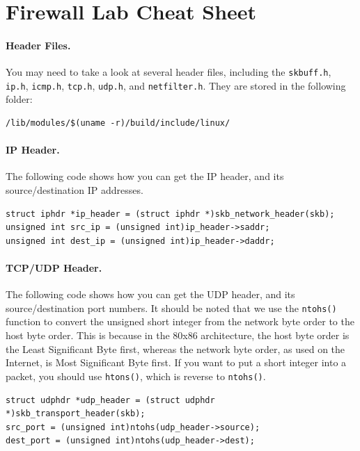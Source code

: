 \newpage
\appendix

\section{Firewall Lab Cheat Sheet} 
\label{sec:cheatsheet}

\paragraph{Header Files.} You may need to take a look at several header
files, including the {\tt skbuff.h}, {\tt ip.h}, {\tt icmp.h}, 
{\tt tcp.h}, {\tt udp.h}, and {\tt netfilter.h}. They are stored in
the following folder: 
\begin{Verbatim}[frame=single]
/lib/modules/$(uname -r)/build/include/linux/
\end{Verbatim}


\paragraph{IP Header.}
The following code shows how you can get the IP header, and its 
source/destination IP addresses. 
\begin{Verbatim}[frame=single]
struct iphdr *ip_header = (struct iphdr *)skb_network_header(skb);
unsigned int src_ip = (unsigned int)ip_header->saddr;
unsigned int dest_ip = (unsigned int)ip_header->daddr;
\end{Verbatim}

\paragraph{TCP/UDP Header.}
The following code shows how you can get the UDP header, and its 
source/destination port numbers. It should be noted that we 
use the {\tt ntohs()} function to convert the unsigned short integer 
from the network byte order to the host byte order. This is because
in the 80x86 architecture, the host byte order is the Least Significant Byte first, 
whereas the network byte order, as used on the Internet, is Most Significant Byte
first. If  you want to put a short integer into a packet, 
you should use {\tt htons()}, which is reverse to {\tt ntohs()}. 
\begin{Verbatim}[frame=single]
struct udphdr *udp_header = (struct udphdr *)skb_transport_header(skb);  
src_port = (unsigned int)ntohs(udp_header->source);        
dest_port = (unsigned int)ntohs(udp_header->dest);    
\end{Verbatim}


